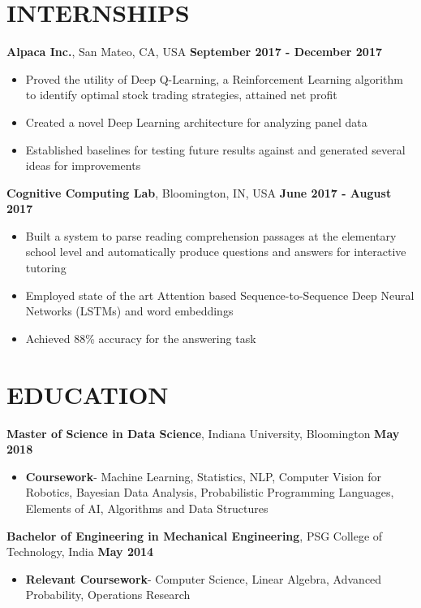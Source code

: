\documentclass{article}
\begin{document}
\section*{INTERNSHIPS}
\noindent
\textbf{Alpaca Inc.}, San Mateo, CA, USA \hfill \textbf{September 2017 - December 2017}
\begin{itemize}
    \item Proved the utility of Deep Q-Learning, a Reinforcement Learning
        algorithm to identify optimal stock trading strategies, attained net profit
    \item Created a novel Deep Learning architecture for analyzing panel data
    \item Established baselines for testing future results against and
        generated several ideas for improvements
\end{itemize}
\textbf{Cognitive Computing Lab}, Bloomington, IN, USA \hfill \textbf{June 2017 - August 2017}
\begin{itemize}
\item Built a system to parse reading comprehension passages at the elementary
    school level and automatically produce questions and answers for interactive tutoring
\item Employed state of the art Attention based Sequence-to-Sequence Deep Neural Networks (LSTMs) and word embeddings
\item Achieved 88\% accuracy for the answering task 
\end{itemize}


\section*{EDUCATION}
\noindent
\textbf{Master of Science in Data Science}, Indiana University, Bloomington \hfill \textbf{May 2018}
\begin{itemize}
    \item \textbf{Coursework}- Machine Learning, Statistics, NLP, Computer Vision for
        Robotics, Bayesian Data Analysis, Probabilistic Programming Languages,
        Elements of AI, Algorithms and Data Structures
\end{itemize}
\textbf{Bachelor of Engineering in Mechanical Engineering}, PSG College of Technology, India \hfill \textbf{May 2014}
\begin{itemize}
    \item \textbf{Relevant Coursework}- Computer Science, Linear Algebra, Advanced Probability, Operations Research 
\end{itemize}
\end{document}
